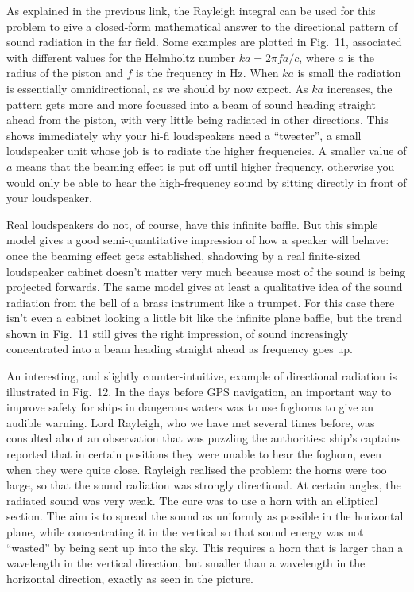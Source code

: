 
  As explained in the previous link, the Rayleigh integral can be used for this 
  problem to give a closed-form mathematical answer to the directional pattern 
  of sound radiation in the far field. Some examples are plotted in Fig.\ 11, 
  associated with different values for the Helmholtz number $ka=2 \pi f a/c$, 
  where $a$ is the radius of the piston and $f$ is the frequency in Hz. When 
  $ka$ is small the radiation is essentially omnidirectional, as we should by 
  now expect. As $ka$ increases, the pattern gets more and more focussed into a 
  beam of sound heading straight ahead from the piston, with very little being 
  radiated in other directions. This shows immediately why your hi-fi 
  loudspeakers need a ``tweeter'', a small loudspeaker unit whose job is to 
  radiate the higher frequencies. A smaller value of $a$ means that the beaming 
  effect is put off until higher frequency, otherwise you would only be able to 
  hear the high-frequency sound by sitting directly in front of your 
  loudspeaker. 


  Real loudspeakers do not, of course, have this infinite baffle. But this 
  simple model gives a good semi-quantitative impression of how a speaker will 
  behave: once the beaming effect gets established, shadowing by a real 
  finite-sized loudspeaker cabinet doesn't matter very much because most of the 
  sound is being projected forwards. The same model gives at least a 
  qualitative idea of the sound radiation from the bell of a brass instrument 
  like a trumpet. For this case there isn't even a cabinet looking a little bit 
  like the infinite plane baffle, but the trend shown in Fig.\ 11 still gives 
  the right impression, of sound increasingly concentrated into a beam heading 
  straight ahead as frequency goes up. 

  An interesting, and slightly counter-intuitive, example of directional 
  radiation is illustrated in Fig.\ 12. In the days before GPS navigation, an 
  important way to improve safety for ships in dangerous waters was to use 
  foghorns to give an audible warning. Lord Rayleigh, who we have met several 
  times before, was consulted about an observation that was puzzling the 
  authorities: ship's captains reported that in certain positions they were 
  unable to hear the foghorn, even when they were quite close. Rayleigh 
  realised the problem: the horns were too large, so that the sound radiation 
  was strongly directional. At certain angles, the radiated sound was very 
  weak. The cure was to use a horn with an elliptical section. The aim is to 
  spread the sound as uniformly as possible in the horizontal plane, while 
  concentrating it in the vertical so that sound energy was not ``wasted'' by 
  being sent up into the sky. This requires a horn that is larger than a 
  wavelength in the vertical direction, but smaller than a wavelength in the 
  horizontal direction, exactly as seen in the picture. 

